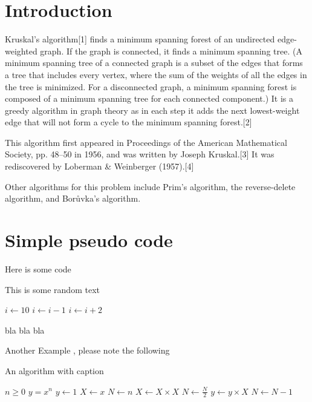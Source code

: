 \documentclass[9pt,twocolumn]{article}
\begin{document}
\section*{Introduction}
\label{sec:orgf6d9620}
Kruskal's algorithm[1] finds a minimum spanning forest of an undirected edge-weighted graph. If the graph is connected, it finds a minimum spanning tree. (A minimum spanning tree of a connected graph is a subset of the edges that forms a tree that includes every vertex, where the sum of the weights of all the edges in the tree is minimized. For a disconnected graph, a minimum spanning forest is composed of a minimum spanning tree for each connected component.) It is a greedy algorithm in graph theory as in each step it adds the next lowest-weight edge that will not form a cycle to the minimum spanning forest.[2]



This algorithm first appeared in Proceedings of the American Mathematical Society, pp. 48–50 in 1956, and was written by Joseph Kruskal.[3] It was rediscovered by Loberman \& Weinberger (1957).[4]

Other algorithms for this problem include Prim's algorithm, the reverse-delete algorithm, and Borůvka's algorithm.


\section*{Simple pseudo code}
\label{sec:org5c3a5bb}
Here is some code

This is some random text



\begin{mdframed}
\begin{algorithmic}
\State $i \gets 10$
    \State $i \gets i-1$
\Else
        \State $i \gets i+2$
    \EndIf
\EndIf
\end{algorithmic}
\end{mdframed}

bla bla bla


Another Example , please note the following


\begin{algorithm}
\caption{An algorithm with caption}\label{alg:cap}
\begin{algorithmic}
\Require $n \geq 0$
\Ensure $y = x^n$
\State $y \gets 1$
\State $X \gets x$
\State $N \gets n$
    \State $X \gets X \times X$
    \State $N \gets \frac{N}{2}$  
    \State $y \gets y \times X$
    \State $N \gets N - 1$
\EndIf
\EndWhile
\end{algorithmic}
\end{algorithm}
\end{document}
